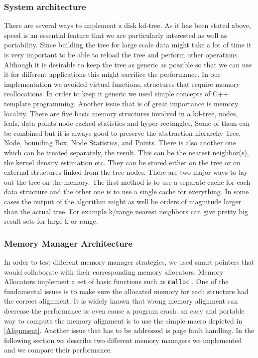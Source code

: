 \documentclass[12pt,letterpaper,doublespaced,ETD,dvips,proposal]{gtthesis}
\begin{document}
\begin{Body}
\subsubsection{System architecture} There are several ways to
implement a disk kd-tree. As it has been stated above, speed is an
essential feature that we are particularly interested as well as
portability. Since building the tree for large scale data might take
a lot of time it is very important to be able to reload the tree and
perform other operations. Although it is desirable to keep the tree
as generic as possible so that we can use it for different
applications this might sacrifice the performance. In our
implementation we avoided virtual functions, structures that require
memory reallocations. In order to keep it generic we used simple
concepts of C++ template programming. Another issue that is of great
importance is memory locality. There are five basic memory
structures involved in a kd-tree, nodes, leafs, data points node
cached statistics and hyper-rectangles. Some of them can be combined
but it is always good to preserve the abstraction hierarchy Tree,
Node, bounding Box, Node Statistics, and Points. There is also
another one which can be treated separately, the result. This can be
the nearest neighbor(s), the kernel density estimation etc. They can
be stored either on the tree or on external structures linked from
the tree nodes. There are two major ways to lay out the tree on the
memory. The first method is to use a separate cache for each data
structure and the other one is to use  a single cache for
everything. In some cases the output of the algorithm might as well
be orders of magnitude larger than the actual tree. For example
k/range nearest neighbors can give pretty big result sets for large
k or range.

\subsubsection{Memory Manager Architecture} In order to test
different memory manager strategies, we used smart pointers that
would collaborate with their corresponding memory allocators. Memory
Allocators implement a set of basic functions such as 
{\verb"malloc" }.
One of the fundamental issues is to make sure the allocated memory for each
structure had the correct alignment. It is widely known that wrong
memory alignment can decrease the performance or even cause a
program crash. an easy and portable way to compute the memory
alignment is to use the simple macro depicted in \ref{Alignment}. Another issue
that has to be addressed is page fault handling. In the following
section we describe two different memory managers we implemented and
we compare their performance.


\end{Body}
\end{document}

